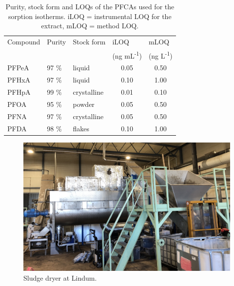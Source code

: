 \begin{table}
    \centering
    \caption{Purity, stock form and LOQs of the PFCAs used for the sorption isotherms. iLOQ = instrumental LOQ for  the extract, mLOQ = method LOQ.}
    \label{tab:PFCAform&LOQ}
    \begin{tabular}{@{}lllcc@{}}
    \toprule
    \multicolumn{1}{l}{Compound}  & \multicolumn{1}{l}{Purity}  & \multicolumn{1}{l}{Stock form} & \multicolumn{1}{l}{iLOQ} & \multicolumn{1}{l}{mLOQ}  \\ 
    & & & \multicolumn{1}{l}{(ng mL\textsuperscript{-1})}  & \multicolumn{1}{l}{(ng L\textsuperscript{-1})} \\ \midrule
     PFPeA  & 97 \%   & liquid      & 0.05 & 0.50   \\
     PFHxA  & 97 \%   & liquid      & 0.10 & 1.00   \\
     PFHpA  & 99 \%   & crystalline & 0.01 & 0.10   \\
     PFOA   & 95 \%   & powder      & 0.05 & 0.50   \\
     PFNA   & 97 \%   & crystalline & 0.05 & 0.50   \\
     PFDA   & 98 \%   & flakes      & 0.10 & 1.00   \\ \bottomrule
    \end{tabular}
\end{table}

\begin{figure}
    \centering
    \includegraphics[width=0.7\linewidth,scale=0.7]{Bilder/Pyrolysis/Dryer.jpg}
    \caption{Sludge dryer at Lindum.}
    \label{fig:dryer}
\end{figure}
